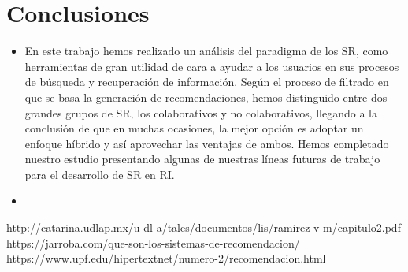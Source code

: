 \newpage

\section{Conclusiones}

\begin{itemize}
\item En este trabajo hemos realizado un análisis del paradigma de los SR, como herramientas de gran utilidad de cara a ayudar a los usuarios en sus procesos de búsqueda y recuperación de información. Según el proceso de filtrado en que se basa la generación de recomendaciones, hemos distinguido entre dos grandes grupos de SR, los colaborativos y no colaborativos, llegando a la conclusión de que en muchas ocasiones, la mejor opción es adoptar un enfoque híbrido y así aprovechar las ventajas de ambos. Hemos completado nuestro estudio presentando algunas de nuestras líneas futuras de trabajo para el desarrollo de SR en RI.

\item 


\end{itemize}


\newpage
\begin{thebibliography}{99}


 http://catarina.udlap.mx/u-dl-a/tales/documentos/lis/ramirez-v-m/capitulo2.pdf
 https://jarroba.com/que-son-los-sistemas-de-recomendacion/ 
 https://www.upf.edu/hipertextnet/numero-2/recomendacion.html

\end{thebibliography}



